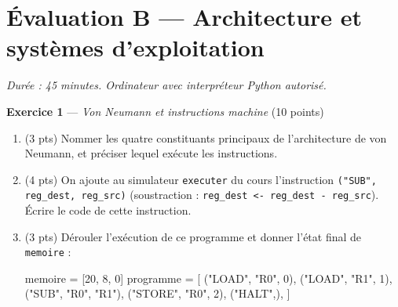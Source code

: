 \section*{Évaluation B --- Architecture et systèmes d'exploitation}
\textit{Durée : 45 minutes. Ordinateur avec interpréteur Python autorisé.}


\bigskip

\textbf{Exercice 1} --- \textit{Von Neumann et instructions machine} \hfill (10 points)

\begin{enumerate}
  \item (3 pts) Nommer les quatre constituants principaux de l'architecture de von Neumann, et préciser lequel exécute les instructions.
  \item (4 pts) On ajoute au simulateur \lstinline{executer} du cours l'instruction \lstinline{("SUB", reg_dest, reg_src)} (soustraction : \lstinline{reg_dest <- reg_dest - reg_src}). Écrire le code de cette instruction.
  \item (3 pts) Dérouler l'exécution de ce programme et donner l'état final de \lstinline{memoire} :
\begin{python}
memoire = [20, 8, 0]
programme = [
    ("LOAD", "R0", 0),
    ("LOAD", "R1", 1),
    ("SUB", "R0", "R1"),
    ("STORE", "R0", 2),
    ("HALT",),
]
\end{python}
\end{enumerate}



